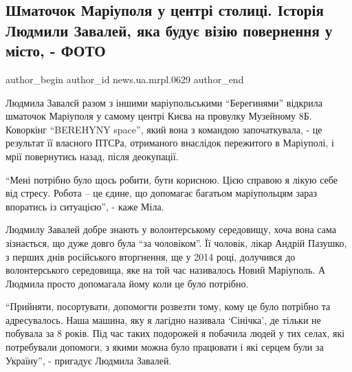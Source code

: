  
 
 
 
 
 
\subsection{Шматочок Маріуполя у центрі столиці. Історія Людмили Завалей, яка будує візію повернення у місто, - ФОТО}
\label{sec:10_08_2023.stz.news.ua.mrpl.0629.1.ljudmyla_zavalej}
 
\ifcmt
 author_begin
   author_id news.ua.mrpl.0629
 author_end
\fi

\begin{qqquote}
Людмила Завалєй разом з іншими маріупольськими \enquote{Берегинями} відкрила шматочок
Маріуполя у самому центрі Києва на провулку Музейному 8Б. Коворкінг
\enquote{BEREHYNY space}, який вона з командою започаткувала,  - це результат
її власного ПТСРа, отриманого внаслідок пережитого в Маріуполі, і мрії
повернутись назад, після деокупації. 
\end{qqquote}

\enquote{Мені потрібно було щось робити, бути корисною. Цією справою я лікую себе від
стресу. Робота – це єдине, що допомагає багатьом маріупольцям зараз впоратись
із ситуацією}, - каже Міла.


Людмилу Завалей добре знають у волонтерському середовищу, хоча вона сама
зізнається, що дуже довго була \enquote{за чоловіком}. Її чоловік, лікар Андрій
Пазушко, з перших днів російського вторгнення, ще у 2014 році, долучився  до
волонтерського середовища, яке на той час називалось Новий Маріуполь. А Людмила
просто допомагала йому коли це було потрібно. 

\enquote{Прийняти, посортувати,  допомогти розвезти тому, кому це було потрібно та
адресувалось. Наша машина, яку я лагідно називала  \enquote{Сінічка}, де тільки не
побувала за 8 років. Під час таких подорожей я побачила людей у тих селах, які
потребували допомоги, з якими можна було працювати і які серцем були за
Україну}, - пригадує Людмила Завалей.

